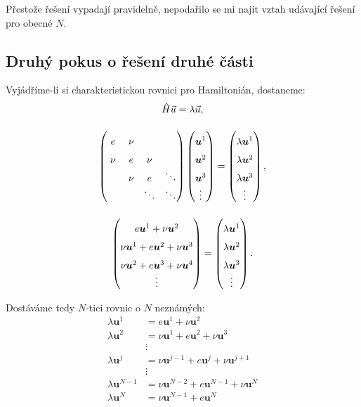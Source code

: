\documentclass[10pt,a4paper]{article}
\newcommand{\mat}[1]{
    \begin{pmatrix}
        #1
    \end{pmatrix}
}
\begin{document}
Přestože řešení vypadají pravidelně, nepodařilo se mi najít vztah udávající řešení pro obecné $N$.

\subsection{Druhý pokus o řešení druhé části}
Vyjádříme-li si charakteristickou rovnici pro Hamiltonián, dostaneme:
\begin{gather*}
    \hat H \vec u = \lambda \vec u,
    \\[10pt]
    \mat{
        e   & \nu & \vphantom{\ddots} \\
        \nu & e   & \nu  & \vphantom{\ddots} \\
            & \nu & e    & \ddots \\
        \phantom{\ddots} &     & \ddots & \ddots
    }
    \mat{
        \bm{u}^1 \vphantom{\ddots} \\
        \bm{u}^2 \vphantom{\ddots} \\
        \bm{u}^3 \vphantom{\ddots} \\
        \vdots \vphantom{\ddots}
    }
    =
    \mat{
        \lambda \bm{u}^1 \vphantom{\ddots} \\
        \lambda \bm{u}^2 \vphantom{\ddots} \\
        \lambda \bm{u}^3 \vphantom{\ddots} \\
        \vdots \vphantom{\ddots}
    },
    \\[10pt]
    \mat{
        e \bm{u}^1 + \nu \bm{u}^2 \vphantom{\ddots} \\
        \nu \bm{u}^1 + e \bm{u}^2 + \nu \bm{u}^3 \vphantom{\ddots} \\
        \nu \bm{u}^2 + e \bm{u}^3 + \nu \bm{u}^4 \vphantom{\ddots} \\
        \vdots \vphantom{\ddots}
    }
    =
    \mat{
        \lambda \bm{u}^1 \vphantom{\ddots} \\
        \lambda \bm{u}^2 \vphantom{\ddots} \\
        \lambda \bm{u}^3 \vphantom{\ddots} \\
        \vdots \vphantom{\ddots}
    }.
\end{gather*}

Dostáváme tedy $N$-tici rovnic o $N$ neznámých:
\begin{align*}
    \lambda \bm{u}^1 &= e \bm{u}^1 + \nu \bm{u}^2 \\
    \lambda \bm{u}^2 &= \nu \bm{u}^1 + e \bm{u}^2 + \nu \bm{u}^3 \\
    &\vdots \\
    \lambda \bm{u}^j &= \nu \bm{u}^{j-1} + e \bm{u}^j + \nu \bm{u}^{j+1} \\
    &\vdots \\
    \lambda \bm{u}^{N-1} &= \nu \bm{u}^{N-2} + e \bm{u}^{N-1} + \nu \bm{u}^N \\
    \lambda \bm{u}^N &= \nu \bm{u}^{N-1} + e \bm{u}^N
\end{align*}
\end{document}
